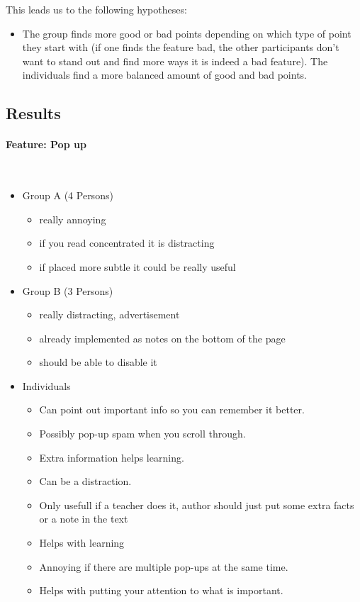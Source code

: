 \documentclass[main.tex]{subfiles}
\begin{document}
This leads us to the following hypotheses:
\begin{itemize}
\item The group finds more good or bad points depending on which type of point they start with (if one finds the feature bad, the other participants don't want to stand out and find more ways it is indeed a bad feature). The individuals find a more balanced amount of good and bad points.
\end{itemize}

\subsection{Results}
\paragraph{Feature: Pop up}~
\begin{itemize}
	\item Group A (4 Persons)
		\begin{itemize}
			\item really annoying
			\item if you read concentrated it is distracting
			\item  if placed more subtle it could be really useful
		\end{itemize}
	\item Group B (3 Persons)
		\begin{itemize}
			\item really distracting, advertisement
			\item already implemented as notes on the bottom of the page
			\item  should be able to disable it
		\end{itemize}
	\item Individuals
		\begin{itemize}
			\item Can point out important info so you can remember it better.
			\item Possibly pop-up spam when you scroll through.
			\item Extra information helps learning.
			\item Can be a distraction.
			\item Only usefull if a teacher does it, author should just put some extra facts or a note in the text
			\item Helps with learning
			\item Annoying if there are multiple pop-ups at the same time.
			\item Helps with putting your attention to what is important.
		\end{itemize}
\end{itemize}
\end{document}
